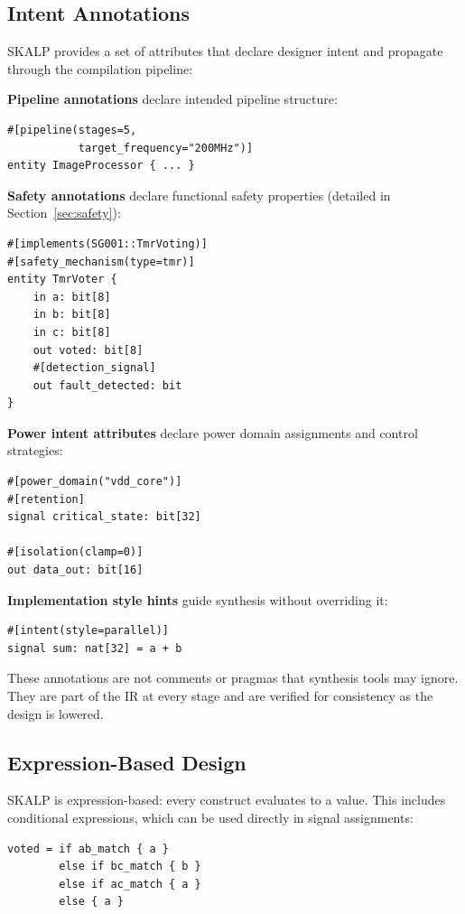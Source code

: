 \documentclass[conference]{IEEEtran}
\begin{document}
\subsection{Intent Annotations}

SKALP provides a set of attributes that declare designer intent and propagate through the compilation pipeline:

\textbf{Pipeline annotations} declare intended pipeline structure:
\begin{lstlisting}
#[pipeline(stages=5,
           target_frequency="200MHz")]
entity ImageProcessor { ... }
\end{lstlisting}

\textbf{Safety annotations} declare functional safety properties (detailed in Section~\ref{sec:safety}):
\begin{lstlisting}
#[implements(SG001::TmrVoting)]
#[safety_mechanism(type=tmr)]
entity TmrVoter {
    in a: bit[8]
    in b: bit[8]
    in c: bit[8]
    out voted: bit[8]
    #[detection_signal]
    out fault_detected: bit
}
\end{lstlisting}

\textbf{Power intent attributes} declare power domain assignments and control strategies:
\begin{lstlisting}
#[power_domain("vdd_core")]
#[retention]
signal critical_state: bit[32]

#[isolation(clamp=0)]
out data_out: bit[16]
\end{lstlisting}

\textbf{Implementation style hints} guide synthesis without overriding it:
\begin{lstlisting}
#[intent(style=parallel)]
signal sum: nat[32] = a + b
\end{lstlisting}

These annotations are not comments or pragmas that synthesis tools may ignore. They are part of the IR at every stage and are verified for consistency as the design is lowered.

\subsection{Expression-Based Design}

SKALP is expression-based: every construct evaluates to a value. This includes conditional expressions, which can be used directly in signal assignments:

\begin{lstlisting}
voted = if ab_match { a }
        else if bc_match { b }
        else if ac_match { a }
        else { a }
\end{lstlisting}
\end{document}

